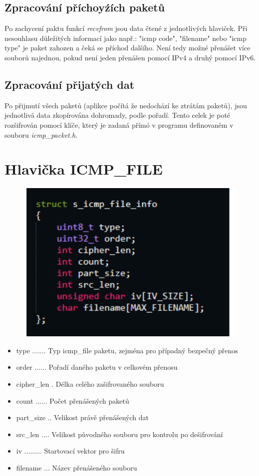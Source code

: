 \documentclass[a4paper, 11pt]{article}
\begin{document}
\subsection{Zpracování příchoyźích paketů}
Po zachycení paktu funkcí \textit{recvfrom} jsou data čtené z jednotlivých hlaviček. Při nesouhlasu důležitých informací jako např.: "icmp code", "filename" nebo "icmp type" je paket zahozen a čeká se příchod dalšího. Není tedy možné přenášet více souborů najednou, pokud není jeden přenášen pomocí IPv4 a druhý pomocí IPv6.

\subsection{Zpracování přijatých dat}
Po přijmutí všech paketů (aplikce počítá že nedochází ke ztrátám paketů), jsou jednotlivá data zkopírována dohromady, podle pořadí. Tento celek je poté rozšifrován pomocí klíče, který je zadaná přímó v programu definovaném v souboru \textit{icmp\_packet.h}.

\section{Hlavička ICMP\_FILE}
\begin{figure}[h]
\includegraphics[scale=0.2]{img/struct.png}
\end{figure}
\begin{itemize}
\item type ....... Typ icmp\_file paketu, zejména pro případný bezpečný přenos
\item order ...... Pořadí daného paketu v celkovém přenosu
\item cipher\_len . Délka celého zašifrovaného souboru
\item count ...... Počet přenášených paketů
\item part\_size .. Velikost právě přenášených dat
\item src\_len .... Velikost původného souboru pro kontrolu po dešifrování
\item iv ......... Startovací vektor pro šifru
\item filename ... Název přenášeného souboru
\end{itemize}
\end{document}

